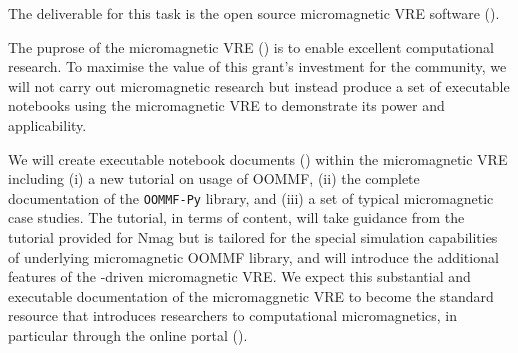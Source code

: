\begin{workpackage}
\begin{tasklist}
\begin{task}[lead=USO,title=Case study: micromagnetic VRE built from
  \TheProject,id=oommf-py-ipython-attributes,PM=6]
  The deliverable for this task is the open source micromagnetic VRE
  software ().
\end{task}

\begin{task}[lead=USO,title=Demonstrator: micromagnetic VRE notebooks,
  id=oommf-tutorial-and-documentation, PM=6]

  The puprose of the micromagnetic VRE
  () is to enable excellent
  computational research. To maximise the value of this grant's investment for the
  community, we will not carry out micromagnetic research but instead
  produce a set of executable notebooks using the micromagnetic VRE
  to demonstrate its power and applicability.

  We will create executable notebook documents () within the micromagnetic VRE
  including (i) a new tutorial on usage of OOMMF, (ii) the complete
  documentation of the \texttt{OOMMF-Py} library, and (iii) a set of
  typical micromagnetic case studies. The tutorial, in terms of
  content, will take guidance from the tutorial provided for Nmag
  \cite{Nmag-tutorial-url} but is tailored for the special simulation
  capabilities of underlying micromagnetic OOMMF library, and will
  introduce the additional features of the \Jupyter-driven
  micromagnetic VRE. We expect this substantial and executable
  documentation of the micromaggnetic VRE to become the standard
  resource that introduces researchers to computational
  micromagnetics, in particular through the online portal ().



\end{task}
\end{tasklist}
\end{workpackage}
